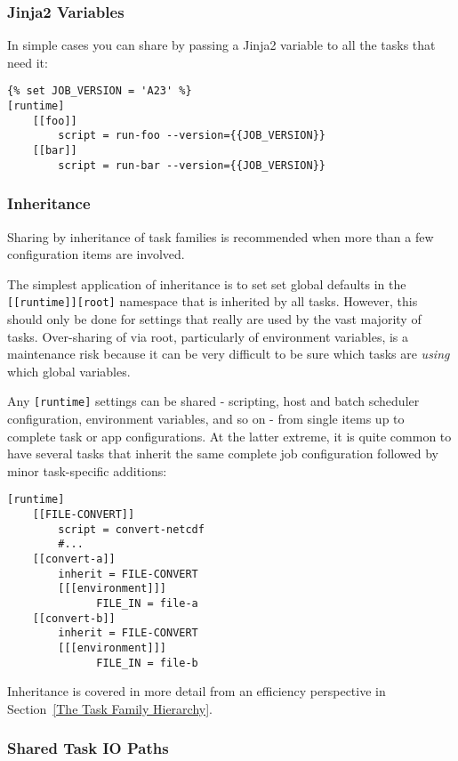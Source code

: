 \subsubsection{Jinja2 Variables}

In simple cases you can share by passing a Jinja2 variable to all the tasks
that need it:

\lstset{language=suiterc}
\begin{lstlisting}
{% set JOB_VERSION = 'A23' %}
[runtime]
    [[foo]]
        script = run-foo --version={{JOB_VERSION}}
    [[bar]]
        script = run-bar --version={{JOB_VERSION}}
\end{lstlisting}

\subsubsection{Inheritance}

Sharing by inheritance of task families is recommended when more than a few
configuration items are involved.

The simplest application of inheritance is to set set global defaults in the
\lstinline=[[runtime]][root]= namespace that is inherited by all tasks.
However, this should only be done for settings that really are used
by the vast majority of tasks. Over-sharing of via root, particularly of
environment variables, is a maintenance risk because it can be very
difficult to be sure which tasks are {\em using} which global variables.

Any \lstinline=[runtime]= settings can be shared - scripting, host
and batch scheduler configuration, environment variables, and so on - from
single items up to complete task or app configurations.  At the latter extreme,
it is quite common to have several tasks that inherit the same complete
job configuration followed by minor task-specific additions:

\lstset{language=suiterc}
\begin{lstlisting}
[runtime]
    [[FILE-CONVERT]]
        script = convert-netcdf
        #...
    [[convert-a]]
        inherit = FILE-CONVERT
        [[[environment]]]
              FILE_IN = file-a
    [[convert-b]]
        inherit = FILE-CONVERT
        [[[environment]]]
              FILE_IN = file-b
\end{lstlisting}

Inheritance is covered in more detail from an efficiency perspective in
Section~\ref{The Task Family Hierarchy}.

\subsubsection{Shared Task IO Paths}
\label{Shared Task IO Paths}

